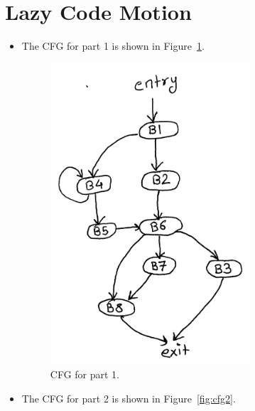\section{Lazy Code Motion}

\begin{itemize}
 
\item The CFG for part 1 is shown in Figure~\ref{fig:cfg1}.
  
\begin{figure}
\centering
\includegraphics[width=0.7\textwidth]{images/CFG.jpg}
\caption{CFG for part 1.}
\label{fig:cfg1}
\end{figure}
 
\item The CFG for part 2 is shown in Figure~\ref{fig:cfg2}.
  

\end{itemize}
